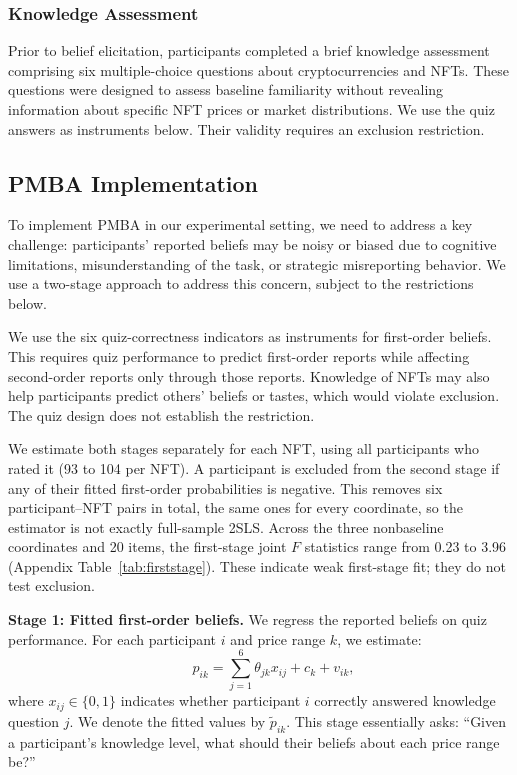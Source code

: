 \documentclass[12pt,reqno]{amsart}
\begin{document}
\subsubsection{Knowledge Assessment}
Prior to belief elicitation, participants completed a brief knowledge assessment comprising six multiple-choice questions about cryptocurrencies and NFTs. These questions were designed to assess baseline familiarity without revealing information about specific NFT prices or market distributions. We use the quiz answers as instruments below. Their validity requires an exclusion restriction.

\subsection{PMBA Implementation}

To implement PMBA in our experimental setting, we need to address a key challenge: participants' reported beliefs may be noisy or biased due to cognitive limitations, misunderstanding of the task, or strategic misreporting behavior. We use a two-stage approach to address this concern, subject to the restrictions below.

We use the six quiz-correctness indicators as instruments for first-order beliefs. This requires quiz performance to predict first-order reports while affecting second-order reports only through those reports. Knowledge of NFTs may also help participants predict others' beliefs or tastes, which would violate exclusion. The quiz design does not establish the restriction.

 We estimate both stages separately for each NFT, using all participants who rated it (93 to 104 per NFT). A participant is excluded from the second stage if any of their fitted first-order probabilities is negative. This removes six participant--NFT pairs in total, the same ones for every coordinate, so the estimator is not exactly full-sample 2SLS. Across the three nonbaseline coordinates and 20 items, the first-stage joint $F$ statistics range from 0.23 to 3.96 (Appendix Table~\ref{tab:firststage}). These indicate weak first-stage fit; they do not test exclusion.

\textbf{Stage 1: Fitted first-order beliefs.} We regress the reported beliefs on quiz performance. For each participant $i$ and price range $k$, we estimate:
\[
\qquad p_{ik} = \sum_{j=1}^6 \theta_{jk} x_{ij} + c_k + v_{ik},
\]
where $x_{ij} \in \{0,1\}$ indicates whether participant $i$ correctly answered knowledge question $j$. We denote the fitted values by $\tilde p_{ik}$. This stage essentially asks: ``Given a participant's knowledge level, what should their beliefs about each price range be?''
\end{document}
